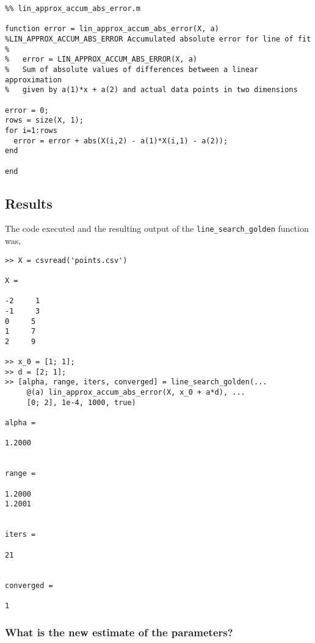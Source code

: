 \documentclass{article}
\begin{document}
\vspace{0.25in}

\begin{lstlisting}
%% lin_approx_accum_abs_error.m

function error = lin_approx_accum_abs_error(X, a)
%LIN_APPROX_ACCUM_ABS_ERROR Accumulated absolute error for line of fit
%
%   error = LIN_APPROX_ACCUM_ABS_ERROR(X, a)
%   Sum of absolute values of differences between a linear approximation
%   given by a(1)*x + a(2) and actual data points in two dimensions

error = 0;
rows = size(X, 1);
for i=1:rows
  error = error + abs(X(i,2) - a(1)*X(i,1) - a(2));
end

end

\end{lstlisting}

\vspace{0.25in}

\subsection{Results}

The code executed and the resulting output of the \texttt{line\_search\_golden} function was,

\vspace{0.25in}

\begin{verbatim}
>> X = csvread('points.csv')

X =

-2     1
-1     3
0     5
1     7
2     9

>> x_0 = [1; 1];
>> d = [2; 1];
>> [alpha, range, iters, converged] = line_search_golden(...
     @(a) lin_approx_accum_abs_error(X, x_0 + a*d), ...
     [0; 2], 1e-4, 1000, true)

alpha =

1.2000


range =

1.2000
1.2001


iters =

21


converged =

1

\end{verbatim}

\vspace{0.25in}

\subsubsection{What is the new estimate of the parameters?}
\end{document}
